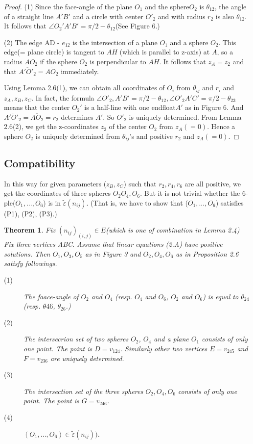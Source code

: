 \documentclass[dvipdfmx]{interact}
\theoremstyle{plain}%
\newtheorem{theorem}{Theorem}[section]
\theoremstyle{definition}
\theoremstyle{remark}
\theoremstyle{problemstyle}
\begin{document}
\begin{proof}
 (1) Since the face-angle of the plane $O_1$ and the sphere$O_2$ is
 $\theta_{12}$, the angle of a straight line $A'B'$ and a circle with
 center $O'_2$ and with radius $r_2$ is also $\theta_{12}$. It follows
 that $\angle O_2'A'B' = \pi/2 - \theta_{12}$(See Figure 6.)
 
 (2) The edge AD - $e_{12}$ is the intersection of a plane $O_1$ and a
 sphere $O_2$. This edge(= plane circle) is tangent to $AH$ (which is
 parallel to z-axis) at $A$, so a radius $AO_2$ if the sphere $O_2$ is
 perpendicular to $AH$. It follows that $z_A=z_2$ and that
 $\overline{A'O'_2} = \overline{AO_2}$ immediately.

 Using Lemma 2.6(1), we can obtain all coordinates of $O_i$ from
 $\theta_{ij}$ and $r_i$ and $z_A, z_B, z_C$. In fact, the formula
 $\angle O'_2, A'B' = \pi/2 - \theta_{12}, \angle O'_{2}A'C' = \pi/2 -
 \theta_{23}$ means that the center $O_2'$ is a half-line with one
 endfloat$A'$ as in Figure 6.
 And $\overline{A'O'_2} = \overline{AO_2} = r_2$ determines $A'$.
 So $O'_2$ is uniquely determined. From Lemma 2.6(2), we get the
 z-coordinates $z_2$ of the center $O_2$ from $z_A(=0)$. Hence a sphere
 $O_2$ is uniquely determined from $\theta_{ij}$'s and positive $r_2$
 and $z_A(= 0)$.
\end{proof}

\subsection{Compatibility}
In this way for given parameters ($z_B, z_C$) such that $r_2, r_4, r_6$
are all positive, we get the coordinates of three spheres 
$O_2 O_4, O_6$. But it is not trivial whether the 6-ple($O_1, ..., O_6$) is
in $\tilde\varepsilon(n_{ij})$. (That is, we have to show that ($O_1,
..., O_6$) satisfies (P1), (P2), (P3).)

\begin{theorem}
 Fix $(n_{ij})_(i, j)\in E$(which is one of combination in Lemma 2.4)
 Fix three vertices ABC. Assume that linear equations (2.A) have
 positive solutions. Then $O_1, O_3, O_5$ as in Figure 3 and $O_2, O_4,
 O_6$ as in Proposition 2.6 satisfy followings.
 \begin{description}
  \item[(1)] The faace-angle of $O_2$ and $O_4$ (resp. $O_4$ and $O_6$,
             $O_2$ and $O_6$) is equal to $\theta_{24}$
             (resp. $\theta{46}$, $\theta_{26}$.)
  \item[(2)] The intersecrion set of two spheres $O_2$, $O_4$ and a plane
             $O_1$ consists of only one point. The point is 
             $D = v_{124}$. Similarly other two vertices $E = v_{245}$
             and $F = v_{236}$ are uniquely determined.
  \item[(3)] The intersection set of the three spheres $O_2, O_4, O_6$
             consists of only one point. The point is $G = v_{246}$.
             
  \item[(4)] $(O_1, ..., O_6) \in \tilde\varepsilon(n_{ij}))$.
\end{description}
\end{theorem}
\end{document}
